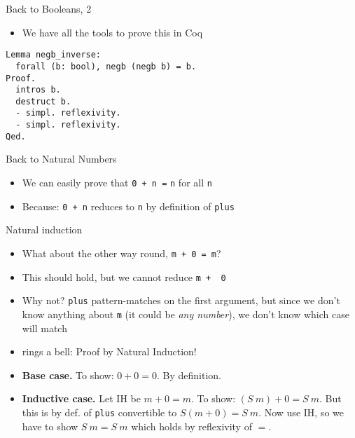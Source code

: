 \begin{frame}[fragile]{Back to Booleans, 2}

\begin{itemize}
  \item We have all the tools to prove this in Coq
\end{itemize}
  \pause
\begin{lstlisting}
Lemma negb_inverse:
  forall (b: bool), negb (negb b) = b.
Proof.
  intros b.
  destruct b.
  - simpl. reflexivity.
  - simpl. reflexivity.
Qed.
\end{lstlisting}

\end{frame}

\begin{frame}[fragile]{Back to Natural Numbers}

\begin{itemize}
  \item We can easily prove that \lstinline|0 + n =| \lstinline|n| for all \lstinline|n|
  \pause
  \item Because: \lstinline|0 + n| reduces to \lstinline|n| by definition of \lstinline|plus|
  \pause
\end{itemize}

\end{frame}

\begin{frame}[fragile]{Natural induction}

\begin{itemize}
  \item What about the other way round, \lstinline|m + 0 =|~\lstinline|m|?
  \pause
  \item This should hold, but we cannot reduce \lstinline|m +  0|
  \pause
  \item Why not? \lstinline|plus| pattern-matches on the first argument, but since we don't know anything about \lstinline|m| (it could be \textit{any number}), we don't know which case will match
  \pause
  \item {} rings a bell: Proof by Natural Induction!
  \pause
  \item \textbf{Base case.} To show: $0 + 0 = 0$. By definition.
  \pause
  \item \textbf{Inductive case.} Let IH be $m + 0 = m$. To show: $(S~m) + 0 = S~m$. But this is by def. of \lstinline|plus| convertible to
  $S (m+ 0) = S~m$. Now use IH, so we have to show $S~m = S~m$ which holds by reflexivity of $=$.
\end{itemize}
\end{frame}

